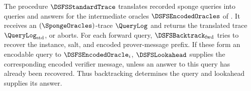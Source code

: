 \begin{definition}[StdTrace]
\label{def:dsfs_stdtrace}
\leanok
{}
The procedure \(\DSFSStandardTrace\) translates recorded sponge queries into queries and answers for the intermediate oracles \(\DSFSEncodedOracles\) of . It receives an \((\SpongeOracles)\)-trace \(\QueryLog\) and returns the translated trace \(\QueryLog_{\mathrm{std}}\), or aborts. For each forward query, \(\DSFSBacktrack_{\mathrm{fwd}}\) tries to recover the instance, salt, and encoded prover-message prefix. If these form an encodable query to \(\DSFSEncodedOracle_i\), \(\DSFSLookahead\) supplies the corresponding encoded verifier message, unless an answer to this query has already been recovered. Thus backtracking determines the query and lookahead supplies its answer.


\end{definition}
